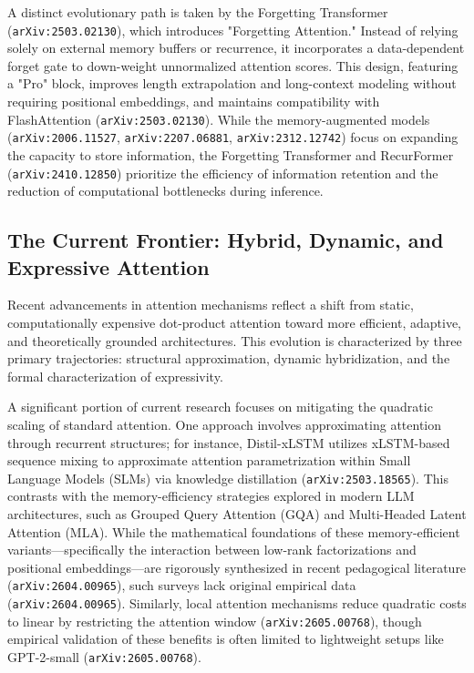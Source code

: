 \documentclass[11pt]{article}
\begin{document}
A distinct evolutionary path is taken by the Forgetting Transformer (\texttt{arXiv:2503.02130}), which introduces "Forgetting Attention." Instead of relying solely on external memory buffers or recurrence, it incorporates a data-dependent forget gate to down-weight unnormalized attention scores. This design, featuring a "Pro" block, improves length extrapolation and long-context modeling without requiring positional embeddings, and maintains compatibility with FlashAttention (\texttt{arXiv:2503.02130}). While the memory-augmented models (\texttt{arXiv:2006.11527}, \texttt{arXiv:2207.06881}, \texttt{arXiv:2312.12742}) focus on expanding the capacity to store information, the Forgetting Transformer and RecurFormer (\texttt{arXiv:2410.12850}) prioritize the efficiency of information retention and the reduction of computational bottlenecks during inference.

\subsection{The Current Frontier: Hybrid, Dynamic, and Expressive Attention}

Recent advancements in attention mechanisms reflect a shift from static, computationally expensive dot-product attention toward more efficient, adaptive, and theoretically grounded architectures. This evolution is characterized by three primary trajectories: structural approximation, dynamic hybridization, and the formal characterization of expressivity.

A significant portion of current research focuses on mitigating the quadratic scaling of standard attention. One approach involves approximating attention through recurrent structures; for instance, Distil-xLSTM utilizes xLSTM-based sequence mixing to approximate attention parametrization within Small Language Models (SLMs) via knowledge distillation (\texttt{arXiv:2503.18565}). This contrasts with the memory-efficiency strategies explored in modern LLM architectures, such as Grouped Query Attention (GQA) and Multi-Headed Latent Attention (MLA). While the mathematical foundations of these memory-efficient variants—specifically the interaction between low-rank factorizations and positional embeddings—are rigorously synthesized in recent pedagogical literature (\texttt{arXiv:2604.00965}), such surveys lack original empirical data (\texttt{arXiv:2604.00965}). Similarly, local attention mechanisms reduce quadratic costs to linear by restricting the attention window (\texttt{arXiv:2605.00768}), though empirical validation of these benefits is often limited to lightweight setups like GPT-2-small (\texttt{arXiv:2605.00768}).
\end{document}
